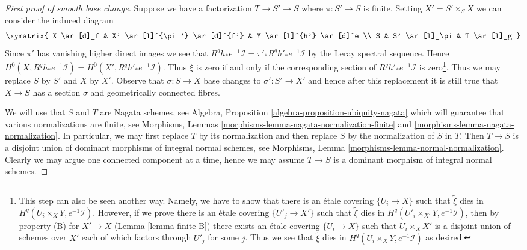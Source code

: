 \begin{proof}[First proof of smooth base change]
\medskip\noindent
Suppose we have a factorization $T \to S' \to S$ where
$\pi : S' \to S$ is finite.
Setting $X' = S' \times_S X$ we can consider the induced diagram
$$
\xymatrix{
X \ar[d]_f & X' \ar[l]^{\pi'} \ar[d]^{f'} & Y \ar[l]^{h'} \ar[d]^e \\
S & S' \ar[l]_\pi & T \ar[l]_g
}
$$
Since $\pi'$ has vanishing higher direct images we see that
$R^qh_*e^{-1}\mathcal{I} = \pi'_*R^qh'_*e^{-1}\mathcal{I}$
by the Leray spectral sequence. Hence
$H^0(X, R^qh_*e^{-1}\mathcal{I}) = H^0(X', R^qh'_*e^{-1}\mathcal{I})$.
Thus $\xi$ is zero if and only if the corresponding section of
$R^qh'_*e^{-1}\mathcal{I}$ is zero\footnote{This
step can also be seen another way. Namely, we have to show that
there is an \'etale covering $\{U_i \to X\}$ such that
$\tilde \xi$ dies in $H^q(U_i \times_X Y, e^{-1}\mathcal{I})$.
However, if we prove there is an \'etale covering
$\{U'_j \to X'\}$ such that $\tilde \xi$ dies in
$H^q(U'_i \times_{X'} Y, e^{-1}\mathcal{I})$, then by property (B)
for $X' \to X$ (Lemma \ref{lemma-finite-B}) there exists an \'etale covering
$\{U_i \to X\}$ such that $U_i \times_X X'$ is a disjoint union
of schemes over $X'$ each of which factors through $U'_j$ for some $j$.
Thus we see that $\tilde \xi$ dies in $H^q(U_i \times_X Y, e^{-1}\mathcal{I})$
as desired.}.
Thus we may replace $S$ by $S'$ and $X$ by $X'$.
Observe that $\sigma : S \to X$ base changes to $\sigma' : S' \to X'$
and hence after this replacement it is still true that $X \to S$
has a section $\sigma$ and geometrically connected fibres.

\medskip\noindent
We will use that $S$ and $T$ are Nagata schemes, see
Algebra, Proposition \ref{algebra-proposition-ubiquity-nagata}
which will guarantee
that various normalizations are finite, see
Morphisms, Lemmas \ref{morphisms-lemma-nagata-normalization-finite} and
\ref{morphisms-lemma-nagata-normalization}.
In particular, we may first replace $T$ by its normalization
and then replace $S$ by the normalization of $S$ in $T$.
Then $T \to S$ is a disjoint union of dominant
morphisms of integral normal schemes, see
Morphisms, Lemma \ref{morphisms-lemma-normal-normalization}.
Clearly we may argue one connected component
at a time, hence we may assume $T \to S$ is a
dominant morphism of integral normal schemes.


\end{proof}
